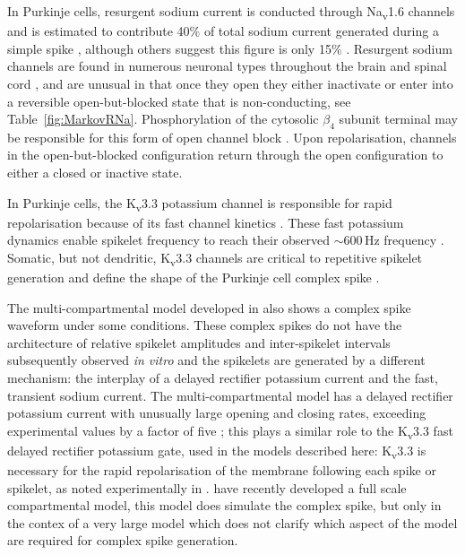 \documentclass[utf8]{frontiersSCNS} %
\newcommand{\hz}{\,\mathrm{Hz}}
\begin{document}
In Purkinje cells, resurgent sodium current is conducted through
Na\textsubscript{v}1.6 channels \cite{RamanBean1997} and is estimated
to contribute 40\% of total sodium current generated during a simple
spike \cite{RamanBean2001}, although others suggest this figure is
only 15\% \cite{LevinEtAl2006}. Resurgent sodium channels are found in
numerous neuronal types throughout the brain and spinal cord
\cite{OsorioEtAl2010}, and are unusual in that once they open they
either inactivate or enter into a reversible open-but-blocked state
that is non-conducting, see Table~\ref{fig:MarkovRNa}. Phosphorylation
of the cytosolic $\beta_4$ subunit terminal may be responsible for
this form of open channel block \cite{GriecoEtAl2002}. Upon
repolarisation, channels in the open-but-blocked configuration return
through the open configuration to either a closed or inactive state.

In Purkinje cells, the K\textsubscript{v}3.3 potassium channel is
responsible for rapid repolarisation \cite{VeysEtAl2013} because of
its fast channel kinetics
\cite{RudyEtAl1999,RudyMcBain2001}. These fast potassium dynamics
enable spikelet frequency to reach their observed $\sim 600\hz$
frequency \cite{WarnaarEtAl2015,BurroughsEtAl2016}. Somatic, but not
dendritic, K\textsubscript{v}3.3 channels are critical to repetitive
spikelet generation and define the shape of the Purkinje cell complex
spike \cite{HurlockEtAl2008,ZaghaEtAl2008,VeysEtAl2013}.

The multi-compartmental model developed in
\cite{DeSchutterBower1994a,DeSchutterBower1994b,DeSchutterBower1994c}
also shows a complex spike waveform under some conditions. These
complex spikes do not have the architecture of relative spikelet
amplitudes and inter-spikelet intervals subsequently observed
\textit{in vitro} and the spikelets are generated by a different
mechanism: the interplay of a delayed rectifier potassium current and
the fast, transient sodium current. The multi-compartmental model has
a delayed rectifier potassium current with unusually large opening and
closing rates, exceeding experimental values by a factor of five
\cite{YamadaEtAl1989}; this plays a similar role to the
K\textsubscript{v}3.3 fast delayed rectifier potassium gate,
\cite{VeysEtAl2013,ZaghaEtAl2008} used in the models described here:
K\textsubscript{v}3.3 is necessary for the rapid repolarisation of the
membrane following each spike or spikelet, as noted experimentally in
\cite{ZaghaEtAl2008,VeysEtAl2013}. \cite{ZangEtAl2018} have recently
developed a full scale compartmental model, this model does simulate
the complex spike, but only in the contex of a very large model which
does not clarify which aspect of the model are required for complex
spike generation.
\end{document}
